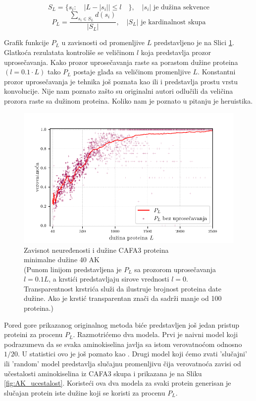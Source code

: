 $$ S_L = \{s_i : \quad | L -  | s_i | | \le l \quad \}, \quad   |s_i| \text{ je dužina sekvence}  $$
$$ P_L = \dfrac{ \sum_{s_i \in S_L} d(s_i)} {| S_L |}, \quad   |S_L| \text{ je kardinalnost skupa}$$

Grafik funkcije $P_L$ u zavisnosti od promenljive $L$ predstavljeno je na Slici
\ref{fig:PL1}.  Glatkoća rezulatata kontroliše se veličinom $l$ koja
predstavlja prozor uprosečavanja. Kako prozor uprosečavanja raste sa porastom
dužine proteina $(l = 0.1 \cdot L)$ tako $P_L$ postaje glađa sa veličinom
promenljive $L$.  Konstantni prozor uprosečavanja je tehnika još poznata
kao  ili  i predstavlja prostu vrstu
konvolucije.  Nije nam poznato  zašto su originalni autori odlučili da veličina
prozora raste sa dužinom proteina. Koliko nam je poznato u pitanju je heruistika.


\begin{figure}[th]
\centering
\includegraphics[]{plots/PL_F}
\caption {
  Zavisnot neuređenosti i dužine CAFA3 proteina \\ minimalne dužine 40 AK
  \\ \footnotesize
  (Punom linijom predstavljena je $P_L$ sa prozorom uprosečavanja $l = 0.1L$, a
  krstići predstavljaju sirove vrednosti $l = 0$. Transparentnost krstrića
  služi da ilustruje brojnost proteina date dužine. Ako je krstić transparentan
  znači da sadrži manje od 100 proteina.)
}
\label{fig:PL1}
\end{figure}


Pored gore prikazanog originalnog metoda biće predstavljen još jedan pristup
  proteini za procenu $P_L$.
Razmotrićemo dva modela. Prvi je naivni model 
koji podrazumeva da se svaka aminokiselina javlja sa istom verovatnoćom odnosno
$1/20$. U statistici ovo je još poznato kao .  Drugi
model koji ćemo zvati 'slučajni' ili 'random' model predstavlja slučajnu
promenljivu čija verovatnoća zavisi od učestalosti aminokiselina iz CAFA3 skupa
i prikazana je na Sliku \ref{fig:AK_ucestalost}.  Koristeći ova dva modela za
svaki protein generisan je slučajan protein iste dužine koji se koristi za
procenu $P_L$.


